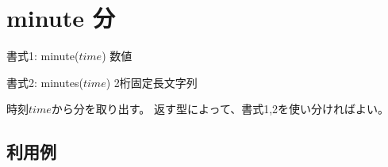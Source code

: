 
%

\section{minute 分\label{sect:minute}}

書式1: minute($time$) 数値

書式2: minutes($time$) 2桁固定長文字列

時刻$time$から分を取り出す。
返す型によって、書式1,2を使い分ければよい。

\subsection*{利用例}


%

